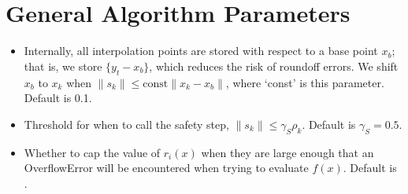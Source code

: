 \documentclass[letterpaper,10pt,english]{sphinxmanual}
\begin{document}
\section{General Algorithm Parameters}
\label{\detokenize{advanced:general-algorithm-parameters}}\begin{itemize}
\item {} 
\sphinxAtStartPar
{} \sphinxhyphen{} Internally, all interpolation points are stored with respect to a base point \(x_b\); that is, we store \(\{y_t-x_b\}\), which reduces the risk of roundoff errors. We shift \(x_b\) to \(x_k\) when \(\|s_k\| \leq \text{const}\|x_k-x_b\|\), where ‘const’ is this parameter. Default is 0.1.

\item {} 
\sphinxAtStartPar
{} \sphinxhyphen{} Threshold for when to call the safety step, \(\|s_k\| \leq \gamma_S \rho_k\). Default is \(\gamma_S =0.5\).

\item {} 
\sphinxAtStartPar
{} \sphinxhyphen{} Whether to cap the value of \(r_i(x)\) when they are large enough that an OverflowError will be encountered when trying to evaluate \(f(x)\). Default is .

\end{itemize}
\end{document}
